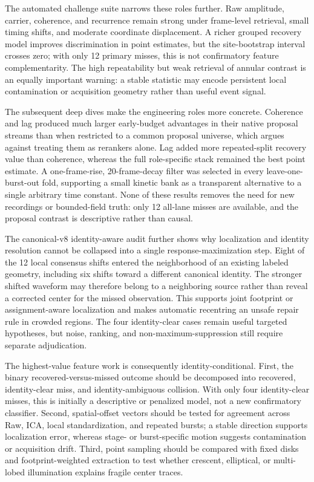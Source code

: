 The automated challenge suite narrows these roles further. Raw amplitude,
carrier, coherence, and recurrence remain strong under frame-level retrieval,
small timing shifts, and moderate coordinate displacement. A richer grouped
recovery model improves discrimination in point estimates, but the
site-bootstrap interval crosses zero; with only 12 primary misses, this is not
confirmatory feature complementarity. The high repeatability but weak retrieval
of annular contrast is an equally important warning: a stable statistic may
encode persistent local contamination or acquisition geometry rather than
useful event signal.

The subsequent deep dives make the engineering roles more concrete. Coherence
and lag produced much larger early-budget advantages in their native proposal
streams than when restricted to a common proposal universe, which argues
against treating them as rerankers alone. Lag added more repeated-split recovery
value than coherence, whereas the full role-specific stack remained the best
point estimate. A one-frame-rise, 20-frame-decay filter was selected in every
leave-one-burst-out fold, supporting a small kinetic bank as a transparent
alternative to a single arbitrary time constant. None of these results removes
the need for new recordings or bounded-field truth: only 12 all-lane misses are
available, and the proposal contrast is descriptive rather than causal.

The canonical-v8 identity-aware audit further shows why localization and
identity resolution cannot be collapsed into a single response-maximization
step. Eight of the 12 local consensus shifts entered the neighborhood of an
existing labeled geometry, including six shifts toward a different canonical
identity. The stronger shifted waveform may therefore belong to a neighboring
source rather than reveal a corrected center for the missed observation. This
supports joint footprint or assignment-aware localization and makes automatic
recentring an unsafe repair rule in crowded regions. The four identity-clear
cases remain useful targeted hypotheses, but noise, ranking, and
non-maximum-suppression still require separate adjudication.

The highest-value feature work is consequently identity-conditional. First,
the binary recovered-versus-missed outcome should be decomposed into recovered,
identity-clear miss, and identity-ambiguous collision. With only four
identity-clear misses, this is initially a descriptive or penalized model, not
a new confirmatory classifier. Second, spatial-offset vectors should be tested
for agreement across Raw, ICA, local standardization, and repeated bursts; a
stable direction supports localization error, whereas stage- or burst-specific
motion suggests contamination or acquisition drift. Third, point sampling
should be compared with fixed disks and footprint-weighted extraction to test
whether crescent, elliptical, or multi-lobed illumination explains fragile
center traces.

